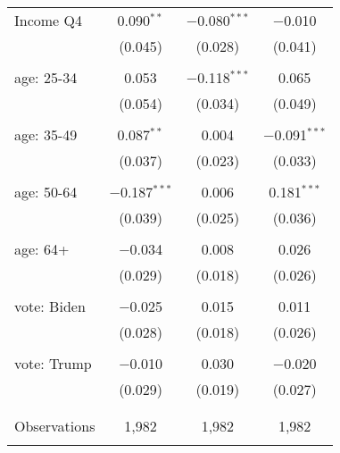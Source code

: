 \begin{tabular}{@{\extracolsep{5pt}}lccc}
 Income Q4 & 0.090$^{**}$ & $-$0.080$^{***}$ & $-$0.010 \\ 
  & (0.045) & (0.028) & (0.041) \\ 
  & & & \\ 
 age: 25-34 & 0.053 & $-$0.118$^{***}$ & 0.065 \\ 
  & (0.054) & (0.034) & (0.049) \\ 
  & & & \\ 
 age: 35-49 & 0.087$^{**}$ & 0.004 & $-$0.091$^{***}$ \\ 
  & (0.037) & (0.023) & (0.033) \\ 
  & & & \\ 
 age: 50-64 & $-$0.187$^{***}$ & 0.006 & 0.181$^{***}$ \\ 
  & (0.039) & (0.025) & (0.036) \\ 
  & & & \\ 
 age: 64+ & $-$0.034 & 0.008 & 0.026 \\ 
  & (0.029) & (0.018) & (0.026) \\ 
  & & & \\ 
 vote: Biden & $-$0.025 & 0.015 & 0.011 \\ 
  & (0.028) & (0.018) & (0.026) \\ 
  & & & \\ 
 vote: Trump & $-$0.010 & 0.030 & $-$0.020 \\ 
  & (0.029) & (0.019) & (0.027) \\ 
  & & & \\ 
\hline \\[-1.8ex] 

Observations & 1,982 & 1,982 & 1,982 \\ 
\hline 
\hline \\[-1.8ex] 
\end{tabular} 